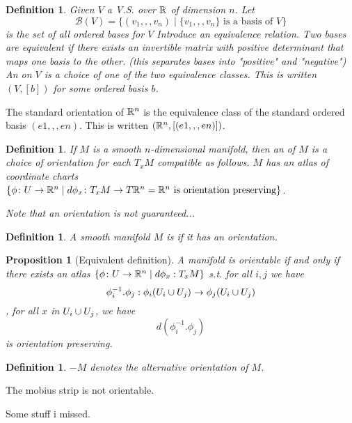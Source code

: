 \documentclass[11pt]{amsbook}
\newenvironment{dateenv}{
	\vspace{1em}
}{
	\vspace{1em}
}
\newcommand{\mydate}[4]{
	\newdate{#1}{#2}{#3}{#4}
	\begin{dateenv}
		\hfill\displaydate{#1}
	\end{dateenv}
}
\theoremstyle{mystyle} %
\newtheorem{defi}[thm]{Definition}
\newtheorem{propo}[thm]{Proposition}
\numberwithin{thm}{section}
\begin{document}
\begin{defi}
	Given $V$ a V.S. over ${\mathbb R}$ of dimension $n$.
	Let $$\mathcal{B}(V) = \{ (v_1,,,v_n) \mid \{v_1,,,v_n\} \text{ is a basis of } V \}$$ is the set of all ordered bases for $V$
	Introduce an equivalence relation.  Two bases are equivalent if there exists an invertible matrix with positive determinant that maps one basis to the other.   (this separates bases into "positive" and "negative")
	An  on $V$ is a choice of one of the two equivalence classes.  This is written $(V, [b])$ for some ordered basis $b$.
\end{defi}
\begin{example}
	The standard orientation of ${\mathbb R}^n$ is the equivalence class of the standard ordered basis $(e1,,,en)$.  This is written $({\mathbb R}^n, [(e1,,,en)])$.
\end{example}
\begin{defi}
	If $M$ is a smooth $n$-dimensional manifold, then an  of $M$ is a choice of orientation for each $T_xM$ compatible as follows.  $M$ has an atlas of coordinate charts $\{ \phi \colon U \to {\mathbb R}^n \mid d\phi_x \colon T_xM \to T{\mathbb R}^n = {\mathbb R}^n \text{ is orientation preserving} \}$.

	Note that an orientation is not guaranteed...
\end{defi}
\begin{defi}
	A smooth manifold $M$ is  if it has an orientation.
\end{defi}
\begin{propo}[Equivalent definition]
	A manifold is orientable if and only if there exists an atlas $\{ \phi \colon U \to {\mathbb R}^n \mid d\phi_x : T_xM \}$ s.t. for all $i,j$ we have $$\phi_i^{-1}.\phi_j : \phi_i(U_i \cup U_j) \to \phi_j(U_i \cup U_j)$$
	, for all $x$ in $U_i \cup U_j$, we have $$d(\phi_i^{-1}.\phi_j)$$ is orientation preserving.
\end{propo}
\begin{defi}
	$-M$ denotes the alternative orientation of $M$.
\end{defi}
\begin{example}
	The mobius strip is not orientable.
\end{example}

\mydate{d14}{16}{11}{2016}

Some stuff i missed.
\end{document}
